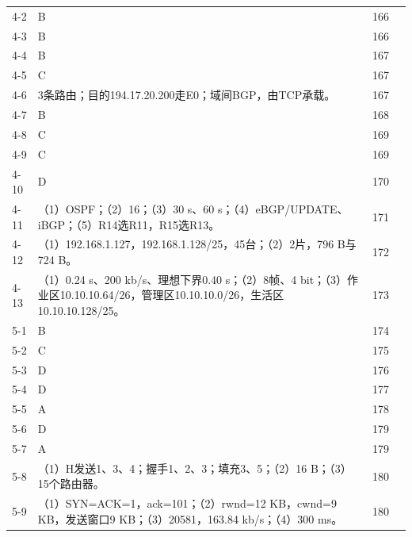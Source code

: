 \documentclass{sidenotes-simplex}
\begin{document}
{\begin{longtable}{@{}p{18mm}p{87mm}p{20mm}p{20mm}@{}}
4-2 & B & 166 & \hyperref[a:CN04-E02]{\pageref*{a:CN04-E02}} \\
4-3 & B & 166 & \hyperref[a:CN04-E03]{\pageref*{a:CN04-E03}} \\
4-4 & B & 167 & \hyperref[a:CN04-E04]{\pageref*{a:CN04-E04}} \\
4-5 & C & 167 & \hyperref[a:CN04-E05]{\pageref*{a:CN04-E05}} \\
4-6 & 3条路由；目的194.17.20.200走E0；域间BGP，由TCP承载。 & 167 & \hyperref[a:CN04-E11]{\pageref*{a:CN04-E11}} \\
4-7 & B & 168 & \hyperref[a:CN04-E06]{\pageref*{a:CN04-E06}} \\
4-8 & C & 169 & \hyperref[a:CN04-E07]{\pageref*{a:CN04-E07}} \\
4-9 & C & 169 & \hyperref[a:CN04-E08]{\pageref*{a:CN04-E08}} \\
4-10 & D & 170 & \hyperref[a:CN04-E09]{\pageref*{a:CN04-E09}} \\
4-11 & （1）OSPF；（2）16；（3）30 s、60 s；（4）eBGP/UPDATE、iBGP；（5）R14选R11，R15选R13。 & 171 & \hyperref[a:CN04-E12]{\pageref*{a:CN04-E12}} \\
4-12 & （1）192.168.1.127，192.168.1.128/25，45台；（2）2片，796 B与724 B。 & 172 & \hyperref[a:CN04-E10]{\pageref*{a:CN04-E10}} \\
4-13 & （1）0.24 s、200 kb/s、理想下界0.40 s；（2）8帧、4 bit；（3）作业区10.10.10.64/26，管理区10.10.10.0/26，生活区10.10.10.128/25。 & 173 & \hyperref[a:CN04-E13]{\pageref*{a:CN04-E13}} \\
5-1 & B & 174 & \hyperref[a:CN05-E01]{\pageref*{a:CN05-E01}} \\
5-2 & C & 175 & \hyperref[a:CN05-E02]{\pageref*{a:CN05-E02}} \\
5-3 & D & 176 & \hyperref[a:CN05-E03]{\pageref*{a:CN05-E03}} \\
5-4 & D & 177 & \hyperref[a:CN05-E04]{\pageref*{a:CN05-E04}} \\
5-5 & A & 178 & \hyperref[a:CN05-E06]{\pageref*{a:CN05-E06}} \\
5-6 & D & 179 & \hyperref[a:CN05-E05]{\pageref*{a:CN05-E05}} \\
5-7 & A & 179 & \hyperref[a:CN05-E07]{\pageref*{a:CN05-E07}} \\
5-8 & （1）H发送1、3、4；握手1、2、3；填充3、5；（2）16 B；（3）15个路由器。 & 180 & \hyperref[a:CN05-E08]{\pageref*{a:CN05-E08}} \\
5-9 & （1）SYN=ACK=1，ack=101；（2）rwnd=12 KB，cwnd=9 KB，发送窗口9 KB；（3）20581，163.84 kb/s；（4）300 ms。 & 180 & \hyperref[a:CN05-E09]{\pageref*{a:CN05-E09}} \\

\end{longtable}}
\end{document}
